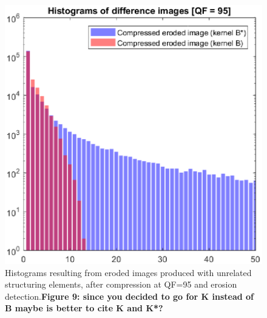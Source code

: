 \documentclass{ieeeaccess}
\begin{document}
\begin{figure}[t!]
	\centering
	\includegraphics[width=\linewidth]{hist_ero_ero_diff.eps}
	\caption{Histograms resulting from eroded images produced with unrelated structuring elements, after compression at QF=95 and erosion detection.\textbf{Figure 9: since you decided to go for K instead of B maybe is better to cite K and K*?}}
	\label{fig:hist_ero_ero_diff}
\end{figure}
\end{document}
